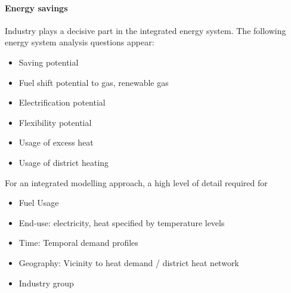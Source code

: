\documentclass[review]{elsarticle}
\begin{document}
\paragraph{Energy savings}


Industry plays a decisive part in the integrated energy system. The following energy system analysis questions appear:
\begin{itemize}
    \item Saving potential
    \item Fuel shift potential to gas, renewable gas
    \item Electrification potential
    \item Flexibility potential
    \item Usage of excess heat
    \item Usage of district heating
\end{itemize}
For an integrated modelling approach, a high level of detail required for
\begin{itemize}
    \item Fuel Usage
    \item End-use: electricity, heat specified by temperature levels
    \item Time: Temporal demand profiles
    \item Geography: Vicinity to heat demand / district heat network
    \item Industry group
\end{itemize} 

\end{document}
